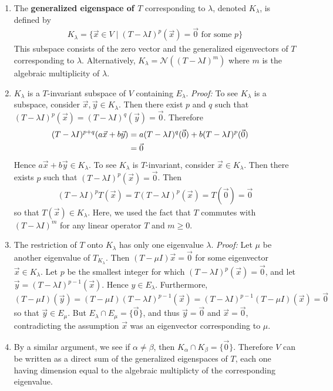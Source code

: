 \documentclass[10pt]{article}
\begin{document}
\begin{multicols*}{2}
\begin{enumerate}
\begin{enumerate}
        \item The \textbf{generalized eigenspace of $T$} corresponding to $\lambda$, denoted $K_\lambda$, is defined by
        \begin{align*}
            K_\lambda = \{ \vec{x} \in V \mid (T - \lambda I)^p(\vec{x}) = \vec{0} \text{  for some $p$}\}
        \end{align*}
        This subspace consists of the zero vector and the generalized eigenvectors of $T$ corresponding to $\lambda$. Alternatively, $K_\lambda = \mathcal{N}((T-\lambda I)^m)$ where $m$ is the algebraic multiplicity of $\lambda$.
        
        \item $K_\lambda$ is a $T$-invariant subspace of $V$ containing $E_\lambda$. \textit{Proof:} To see $K_\lambda$ is a subspace, consider $\vec{x}, \vec{y} \in K_\lambda$. Then there exist $p$ and $q$ such that $(T-\lambda I)^p(\vec{x})=(T-\lambda I)^q(\vec{y}) = \vec{0}$. Therefore 
        \begin{align*}
        \hspace{-4mm}
            (T-\lambda I)^{p+q}(a\vec{x}+b\vec{y})   &= a(T-\lambda I)^q(\vec{0}) + b(T-\lambda I)^p(\vec{0}) \\
            &= \vec{0}
        \end{align*}
        Hence $a\vec{x} + b\vec{y} \in K_\lambda$. To see $K_\lambda$ is $T$-invariant, consider $\vec{x} \in K_\lambda$. Then there exists $p$ such that $(T-\lambda I)^p(\vec{x})=\vec{0}$. Then
        \begin{align*}
            (T-\lambda I)^p T(\vec{x}) = T(T-\lambda I)^p (\vec{x}) = T(\vec{0}) = \vec{0}
        \end{align*}
        so that $T(\vec{x}) \in K_\lambda$. Here, we used the fact that $T$ commutes with $(T-\lambda I)^m$ for any linear operator $T$ and $m \geq 0$.
        
        \item The restriction of $T$ onto $K_\lambda$ has only one eigenvalue $\lambda$. \textit{Proof:} Let $\mu$ be another eigenvalue of $T_{K_\lambda}$. Then $(T-\mu I)\vec{x}=\vec{0}$ for some eigenvector $\vec{x} \in K_\lambda$. Let $p$ be the smallest integer for which $(T-\lambda I)^p (\vec{x}) = \vec{0}$, and let $\vec{y} = (T-\lambda I)^{p-1} (\vec{x})$. Hence $y \in E_\lambda$. Furthermore, $(T - \mu I)(\vec{y}) = (T-\mu I)(T-\lambda I)^{p-1}(\vec{x}) = (T-\lambda I)^{p-1}(T-\mu I)(\vec{x}) = \vec{0}$ so that $\vec{y} \in E_\mu$. But $E_\lambda \cap E_\mu = \{ \vec{0} \}$, and thus $\vec{y}=\vec{0}$ and $\vec{x}=\vec{0}$, contradicting the assumption $\vec{x}$ was an eigenvector corresponding to $\mu$.
        \item By a similar argument, we see if $\alpha \neq \beta$, then $K_\alpha \cap K_\beta = \{ \vec{0} \}$. Therefore $V$ can be written as a direct sum of the generalized eigenspaces of $T$, each one having dimension equal to the algebraic multiplicty of the corresponding eigenvalue.
        

\end{enumerate}
\end{enumerate}
\end{multicols*}
\end{document}
